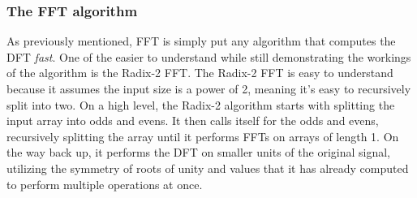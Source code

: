 







\subsubsection{The FFT algorithm}
As previously mentioned, FFT is simply put any algorithm that computes the DFT \textit{fast}. One of the easier to understand while still demonstrating the workings of the algorithm is the Radix-2 FFT. The Radix-2 FFT is easy to understand because it assumes the input size is a power of 2, meaning it's easy to recursively split into two. On a high level, the Radix-2 algorithm starts with splitting the input array into odds and evens. It then calls itself for the odds and evens, recursively splitting the array until it performs FFTs on arrays of length 1. On the way back up, it performs the DFT on smaller units of the original signal, utilizing the symmetry of roots of unity and values that it has already computed to perform multiple operations at once. 

